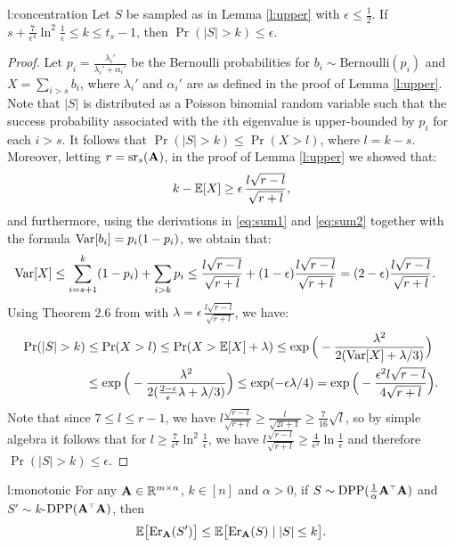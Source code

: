\documentclass{article}
\begin{document}
\begin{replemma}{l:concentration}
Let $S$ be sampled as in Lemma \ref{l:upper} with $\epsilon\leq \frac12$.
If $s+\frac7{\epsilon^4}\ln^2\!\frac1\epsilon \leq k\leq t_s-1$, then
$\Pr(|S|>k) \leq \epsilon$.
\end{replemma}
\begin{proof}
 Let $p_i=\frac{\lambda_i'}{\lambda_i'+\alpha_i'}$ be the 
      Bernoulli probabilities for
  $b_i\sim\mathrm{Bernoulli}(p_i)$
  and $X =\sum_{i>s} b_i$, where $\lambda_i'$ and $\alpha_i'$ are as
  defined in the proof of Lemma \ref{l:upper}. Note that $|S|$ is
  distributed as a Poisson binomial random variable such that the success
  probability associated with the $i$th eigenvalue is upper-bounded by
  $p_i$ for each $i>s$. It follows that $\Pr(|S|\!>\!k)\leq \Pr(X\!>\!l)$, where $l=k-s$.
Moreover, letting $r={\mathrm{sr}}_s(\mathbf A)$, in the proof of Lemma \ref{l:upper} we showed that:
  \begin{align*}
k - \mathbb E[X] \geq \epsilon\,\frac{ l\sqrt{r-l}}{\sqrt{r+l}},
  \end{align*}
  and furthermore, using the derivations in \eqref{eq:sum1} and
  \eqref{eq:sum2} together with the formula $\mathrm{Var}[b_i]=p_i(1-p_i)$, we obtain that:
  \begin{align*}
    \mathrm{Var}[X]&\leq \sum_{i=s+1}^{k}(1-p_i) + \sum_{i>k}p_i
    \leq \frac{l\sqrt{r-l}}{\sqrt{r+l}}+
      (1-\epsilon)\frac{l\sqrt{r-l}}{\sqrt{r+l}} = (2-\epsilon) \frac{l\sqrt{r-l}}{\sqrt{r+l}}.
  \end{align*}
    Using Theorem 2.6 from \citet{ChungLu2006book} with $\lambda=\epsilon\,\frac{
    l\sqrt{r-l}}{\sqrt{r+l}}$, we have:
  \begin{align*}
    \Pr(|S|>k)&\leq \Pr(X>l)\leq \Pr(X > \E[X]+\lambda)
    \leq \exp\Big(-\frac{\lambda^2}{2(\Var[X]+\lambda/3)}\Big)\\
    &\leq \exp\Big(-\frac{\lambda^2}{2(\frac{2-\epsilon}\epsilon
      \lambda+\lambda/3)}\Big)\leq\exp(-\epsilon\lambda /4)
      =\exp\Big(-\frac{\epsilon^2l\sqrt{r-l}}{4\sqrt{r+l}}\Big). 
  \end{align*}
  Note that since $7\leq l\leq r-1$, we have $l\frac{\sqrt{r-l}}{\sqrt{r+l}}\geq
\frac{l}{\sqrt{2l+1}}\geq \frac{7}{16}\sqrt l$, so by simple algebra
it follows that for $l\geq \frac 7{\epsilon^4}\ln^2\frac1\epsilon$,
we have $l\frac{\sqrt{r-l}}{\sqrt{r+l}}\geq
\frac4{\epsilon^2}\ln\frac1\epsilon$ and therefore
$\Pr(|S|>k)\leq \epsilon$. 
\end{proof}
\begin{replemma}{l:monotonic}
  For any $\mathbf A\in\mathbb R^{m\times n}$, $k\in[n]$ and $\alpha>0$, if
  $S\sim\DPP(\frac1\alpha\A^\top\A)$ and $S'\sim k$-$\DPP(\A^\top\A)$, then
  \begin{align*}
    \mathbb E\big[\mathrm{Er}_\mathbf A(S')\big] \leq \mathbb E\big[\mathrm{Er}_\mathbf A(S)\mid |S|\leq k\big].
  \end{align*}
\end{replemma}
\end{document}
